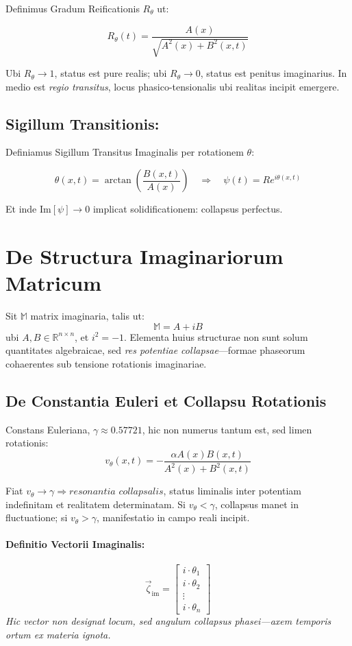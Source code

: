 Definimus Gradum Reificationis $R_{\theta}$ ut:

\[
R_{\theta}(t) = \frac{A(x)}{\sqrt{A^2(x) + B^2(x, t)}}
\]

Ubi $R_{\theta} \to 1$, status est pure realis; ubi $R_{\theta} \to 0$, status est penitus imaginarius. In medio est \textit{regio transitus}, locus phasico-tensionalis ubi realitas incipit emergere.

\subsection*{Sigillum Transitionis:}

Definiamus Sigillum Transitus Imaginalis per rotationem $\theta$:

\[
\theta(x,t) = \arctan\left(\frac{B(x,t)}{A(x)}\right)
\quad \Rightarrow \quad
\psi(t) = R e^{i\theta(x,t)}
\]

Et inde $\text{Im}[\psi] \to 0$ implicat solidificationem: collapsus perfectus.

\section*{De Structura Imaginariorum Matricum}

Sit \( \mathbb{M} \) matrix imaginaria, talis ut:
\[
\mathbb{M} = A + iB
\]
ubi \( A, B \in \mathbb{R}^{n \times n} \), et \( i^2 = -1 \). Elementa huius structurae non sunt solum quantitates algebraicae, sed \textit{res potentiae collapsae}---formae phaseorum cohaerentes sub tensione rotationis imaginariae.

\subsection*{De Constantia Euleri et Collapsu Rotationis}

Constans Euleriana, \( \gamma \approx 0.57721 \), hic non numerus tantum est, sed limen rotationis:
\[
v_\theta(x, t) = -\frac{\alpha A(x) B(x, t)}{A^2(x) + B^2(x, t)}
\]

Fiat \( v_\theta \rightarrow \gamma \Rightarrow \textit{resonantia collapsalis} \), status liminalis inter potentiam indefinitam et realitatem determinatam.  
Si \( v_\theta < \gamma \), collapsus manet in fluctuatione;  
si \( v_\theta > \gamma \), manifestatio in campo reali incipit.

\paragraph{Definitio Vectorii Imaginalis:}
\[
\vec{\zeta}_{\text{im}} =
\begin{bmatrix}
 i \cdot \theta_1 \\
 i \cdot \theta_2 \\
 \vdots \\
 i \cdot \theta_n
\end{bmatrix}
\]
\textit{Hic vector non designat locum, sed angulum collapsus phasei---axem temporis ortum ex materia ignota.}

